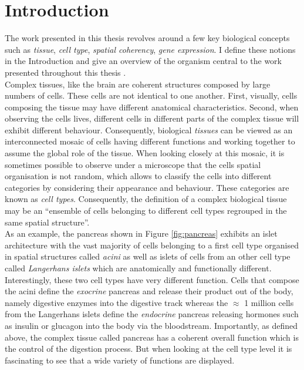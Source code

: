 %
\chapter{Introduction}\label{ch:background}
%
	
	The work presented in this thesis revolves around a few key biological concepts such as \emph{tissue}, \emph{cell type}, \emph{spatial coherency}, \emph{gene expression}. I define these notions in the Introduction and give an overview of the organism central to the work presented throughout this thesis \platyfull{}.\\
	
    Complex tissues, like the brain are coherent structures composed by large numbers of cells. These cells are not identical to one another. First, visually, cells composing the tissue may have different anatomical characteristics. Second, when observing the cells lives, different cells in different parts of the complex tissue will exhibit different behaviour. Consequently, biological \emph{tissues} can be viewed as an interconnected mosaic of cells having different functions and working together to assume the global role of the tissue. When looking closely at this mosaic, it is sometimes possible to observe under a microscope \cite{young13} that the cells spatial organisation is not random, which allows to classify the cells into different categories by considering their appearance and behaviour. These categories are known as \emph{cell types}. Consequently, the definition of a complex biological tissue may be an ``ensemble of cells belonging to different cell types regrouped in the same spatial structure''.\\
    
     As an example, the pancreas shown in Figure \ref{fig:pancreas} exhibits an islet architecture \cite{brissova05} with the vast majority of cells belonging to a first cell type organised in spatial structures called \emph{acini} as well as islets of cells from an other cell type called \emph{Langerhans islets} which are anatomically and functionally different.\\
     
      Interestingly, these two cell types have very different function. Cells that compose the acini define the \emph{exocrine} pancreas and release their product out of the body, namely digestive enzymes into the digestive track \cite{rodriguez11} whereas the $\approx$ 1 million cells \cite{hellman09} from the Langerhans islets define the \emph{endocrine} pancreas releasing hormones such as insulin or glucagon into the body via the bloodstream. Importantly, as defined above, the complex tissue called pancreas has a coherent overall function which is the control of the digestion process. But when looking at the cell type level it is fascinating to see that a wide variety of functions are displayed.\\
     
